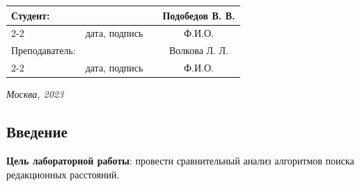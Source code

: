 \documentclass[12pt, a4paper]{article}
\begin{document}
\begin{titlepage}
  \fontsize{14}{21}\selectfont
  \vspace{5cm}


  \noindent\begin{tabularx}{\textwidth}{ X >{\centering}p{4cm} p{1cm} c }
   Студент: & & & Подобедов В. В. \\ \cline{2-2} \cline{4-4}
   & \fontsize{10}{15}\selectfont дата, подпись & & \fontsize{10}{15}\selectfont Ф.И.О. \\
   Преподаватель: & & & Волкова Л. Л.\\ \cline{2-2} \cline{4-4}
   & \fontsize{10}{15}\selectfont дата, подпись & & \fontsize{10}{15}\selectfont Ф.И.О.
  \end{tabularx}

  \vspace{\fill}

  \begin{center}
   \it{Москва}, 2023
  \end{center}

  \thispagestyle{empty}
\end{titlepage}


\renewcommand{\contentsname}{Содержание}
\setcounter{page}{2}
\tableofcontents

\newpage
\begin{center}
   \section*{Введение} 
\end{center}


\vspace{5mm}
\raggedright
\justifying
\textbf{Цель лабораторной работы}: провести сравнительный анализ алгоритмов поиска редакционных расстояний.
\end{document}
